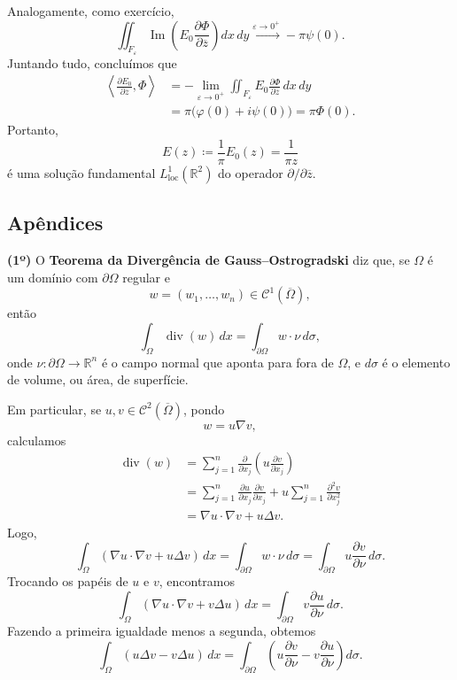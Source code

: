 \documentclass[../distribution_theory_notes.tex]{subfiles}
\begin{document}
Analogamente, como exercício,
\[
	\iint_{F_{\varepsilon}}
	\operatorname{Im}\left(
	E_{0}\frac{\partial\Phi}{\partial\overline{z}}
	\right)dx\,dy
	\stackrel{\varepsilon\to0^{+}}{\longrightarrow}
	-\pi\psi(0).
\]
Juntando tudo, concluímos que
\begin{align*}
	\left\langle\frac{\partial E_{0}}{\partial\overline{z}},\Phi\right\rangle
	 & =-\lim_{\varepsilon\to0^{+}}
	\iint_{F_{\varepsilon}}E_{0}\frac{\partial\Phi}{\partial\overline{z}}\,dx\,dy \\
	 & =\pi\bigl(\varphi(0)+i\psi(0)\bigr)
	=\pi\Phi(0).
\end{align*}
Portanto,
\[
	E(z)\coloneqq\frac{1}{\pi}E_{0}(z)=\frac{1}{\pi z}
\]
é uma solução fundamental \(L_{\mathrm{loc}}^{1}(\mathbb{R}^{2})\) do operador \(\partial/\partial\overline{z}\).

\subsection{Apêndices}
\textbf{(1º)} O \textbf{Teorema da Divergência de Gauss--Ostrogradski} diz que, se \(\Omega\) é um domínio com \(\partial\Omega\) regular e
\[
	w=(w_{1},\ldots,w_{n})\in\mathcal{C}^{1}(\overline{\Omega}),
\]
então
\[
	\int_{\Omega}\operatorname{div}(w)\,dx
	=\int_{\partial\Omega}w\cdot\nu\,d\sigma,
\]
onde \(\nu:\partial\Omega\to\mathbb{R}^{n}\) é o campo normal que aponta para fora de \(\Omega\), e \(d\sigma\) é o elemento de volume, ou área, de superfície.

Em particular, se \(u,v\in\mathcal{C}^{2}(\overline{\Omega})\), pondo
\[
	w=u\nabla v,
\]
calculamos
\begin{align*}
	\operatorname{div}(w)
	 & =\sum\limits_{j=1}^{n}\frac{\partial}{\partial x_{j}}
	\left(u\frac{\partial v}{\partial x_{j}}\right)                 \\
	 & =\sum\limits_{j=1}^{n}\frac{\partial u}{\partial x_{j}}
	\frac{\partial v}{\partial x_{j}}
	+u\sum\limits_{j=1}^{n}\frac{\partial^{2}v}{\partial x_{j}^{2}} \\
	 & =\nabla u\cdot\nabla v+u\Delta v.
\end{align*}
Logo,
\[
	\int_{\Omega}(\nabla u\cdot\nabla v+u\Delta v)\,dx
	=\int_{\partial\Omega}w\cdot\nu\,d\sigma
	=\int_{\partial\Omega}u\frac{\partial v}{\partial\nu}\,d\sigma.
\]
Trocando os papéis de \(u\) e \(v\), encontramos
\[
	\int_{\Omega}(\nabla u\cdot\nabla v+v\Delta u)\,dx
	=\int_{\partial\Omega}v\frac{\partial u}{\partial\nu}\,d\sigma.
\]
Fazendo a primeira igualdade menos a segunda, obtemos
\[
	\int_{\Omega}(u\Delta v-v\Delta u)\,dx
	=\int_{\partial\Omega}
	\left(
	u\frac{\partial v}{\partial\nu}
	-v\frac{\partial u}{\partial\nu}
	\right)d\sigma.
\]
\end{document}
